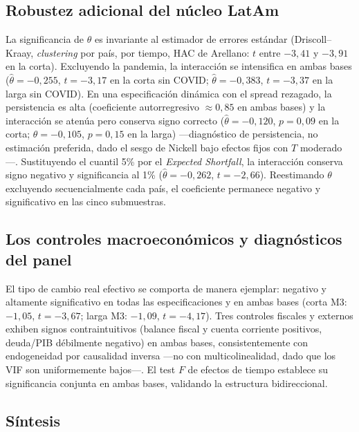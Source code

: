 \documentclass[5p,times,twocolumn,authoryear]{elsarticle}
\begin{document}
\subsection{Robustez adicional del núcleo LatAm}

La significancia de $\theta$ es invariante al estimador de errores estándar (Driscoll–Kraay, \textit{clustering} por país, por tiempo, HAC de Arellano: $t$ entre $-3{,}41$ y $-3{,}91$ en la corta). Excluyendo la pandemia, la interacción se intensifica en ambas bases ($\hat\theta=-0{,}255$, $t=-3{,}17$ en la corta sin COVID; $\hat\theta=-0{,}383$, $t=-3{,}37$ en la larga sin COVID). En una especificación dinámica con el spread rezagado, la persistencia es alta (coeficiente autorregresivo $\approx0{,}85$ en ambas bases) y la interacción se atenúa pero conserva signo correcto ($\hat\theta=-0{,}120$, $p=0{,}09$ en la corta; $\hat\theta=-0{,}105$, $p=0{,}15$ en la larga) —diagnóstico de persistencia, no estimación preferida, dado el sesgo de Nickell bajo efectos fijos con $T$ moderado—. Sustituyendo el cuantil 5\% por el \textit{Expected Shortfall}, la interacción conserva signo negativo y significancia al 1\% ($\hat\theta=-0{,}262$, $t=-2{,}66$). Reestimando $\theta$ excluyendo secuencialmente cada país, el coeficiente permanece negativo y significativo en las cinco submuestras.

\subsection{Los controles macroeconómicos y diagnósticos del panel}

El tipo de cambio real efectivo se comporta de manera ejemplar: negativo y altamente significativo en todas las especificaciones y en ambas bases (corta M3: $-1{,}05$, $t=-3{,}67$; larga M3: $-1{,}09$, $t=-4{,}17$). Tres controles fiscales y externos exhiben signos contraintuitivos (balance fiscal y cuenta corriente positivos, deuda/PIB débilmente negativo) en ambas bases, consistentemente con endogeneidad por causalidad inversa —no con multicolinealidad, dado que los VIF son uniformemente bajos—. El test $F$ de efectos de tiempo establece su significancia conjunta en ambas bases, validando la estructura bidireccional.

\subsection{Síntesis}
\end{document}
